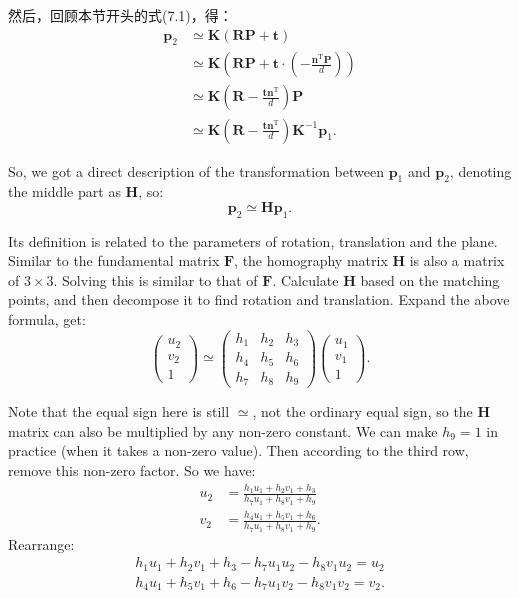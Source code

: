 然后，回顾本节开头的式(7.1)，得：
\begin{align*}
\mathbf{p}_2 &\simeq \mathbf{K} ( \mathbf{R} \mathbf{P} + \mathbf{t} ) \\ 
&\simeq \mathbf{K} \left( \mathbf{R} \mathbf{P} + \mathbf{t} \cdot (- \frac{\mathbf{n}^\mathrm{T} \mathbf{P} }{d}) \right) \\
&\simeq \mathbf{K} \left( \mathbf{R} - \frac{\mathbf{t} \mathbf{n}^\mathrm{T} }{d} \right) \mathbf{P} \\ 
&\simeq \mathbf{K} \left( \mathbf{R} - \frac{\mathbf{t} \mathbf{n}^\mathrm{T} }{d} \right) \mathbf{K}^{-1} \mathbf{p}_1.
\end{align*}

So, we got a direct description of the transformation between $\mathbf{p}_1$ and $\mathbf{p}_2$, denoting the middle part as $\mathbf{H}$, so:
\begin{equation}
\mathbf{p}_2 \simeq \mathbf{H} \mathbf{p}_1.
\end{equation}

Its definition is related to the parameters of rotation, translation and the plane. Similar to the fundamental matrix $\mathbf{F}$, the homography matrix $\mathbf{H}$ is also a matrix of $3 \times 3$. Solving this is similar to that of $\mathbf{F}$. Calculate $\mathbf{H}$ based on the matching points, and then decompose it to find rotation and translation. Expand the above formula, get:
\begin{equation}
\begin{pmatrix} 
u_{2}\\v_{2}\\1
\end{pmatrix}
\simeq
\begin{pmatrix}
 h_{1} & h_{2} & h_{3}\\ 
 h_{4} & h_{5} & h_{6}\\ 
 h_{7} & h_{8} & h_{9} 
\end{pmatrix}
\begin{pmatrix} 
u_{1}\\v_{1}\\1
\end{pmatrix}.
\end{equation}

Note that the equal sign here is still $\simeq$, not the ordinary equal sign, so the $\mathbf{H}$ matrix can also be multiplied by any non-zero constant. We can make $h_9 = 1$ in practice (when it takes a non-zero value). Then according to the third row, remove this non-zero factor. So we have:
\[
\begin{aligned}
u_{2}&=\frac{h_{1}u_{1}+h_{2}v_{1}+h_{3}}{h_{7}u_{1}+h_{8}v_{1}+h_{9}}\\
v_{2}&=\frac{h_{4}u_{1}+h_{5}v_{1}+h_{6}}{h_{7}u_{1}+h_{8}v_{1}+h_{9}}.
\end{aligned}
\]
Rearrange:
\[
\begin{gathered}
h_{1}u_{1}+h_{2}v_{1}+h_{3}-h_{7}u_{1}u_{2}-h_{8}v_{1}u_{2}=u_{2}\\
h_{4}u_{1}+h_{5}v_{1}+h_{6}-h_{7}u_{1}v_{2}-h_{8}v_{1}v_{2}=v_{2}.
\end{gathered}
\]

